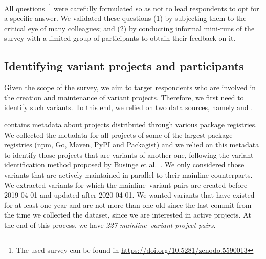 All questions~\footnote{The used survey can be found in \url{https://doi.org/10.5281/zenodo.5590013}} were carefully formulated so as not to lead respondents to opt for a specific answer. We validated these questions (1) by subjecting them to the critical eye of many colleagues; and (2) by conducting informal mini-runs of the survey with a limited group of participants to obtain their feedback on it. 



\subsection{Identifying variant projects and participants}
\label{sec:forks_and_participants}

Given the scope of the survey, we aim to target respondents who are involved in the creation and maintenance of variant projects.%
Therefore, we first need to identify such variants.
To this end, we relied on two data sources, namely \librariesio and \gh.

\librariesio contains metadata about projects distributed through various package registries. We collected the metadata for all projects of some of the largest package registries (\textsf{npm, Go, Maven, PyPI} and \textsf{Packagist}) and we relied on this metadata to identify those projects that are variants of another one, following the variant identification method proposed by  Businge et al.~\cite{businge:emse:2021,businge:benevol:2020}. %
We only considered those variants that are actively maintained in parallel to their mainline counterparts. We extracted variants for which the mainline--variant pairs are created before 2019-04-01 and updated after 2020-04-01. We wanted variants that have existed for at least one year and are not more than one old since the last commit from the time we collected the dataset, since we are interested in active projects.
At the end of this process, we have \textit{227 mainline–variant project pairs}.

